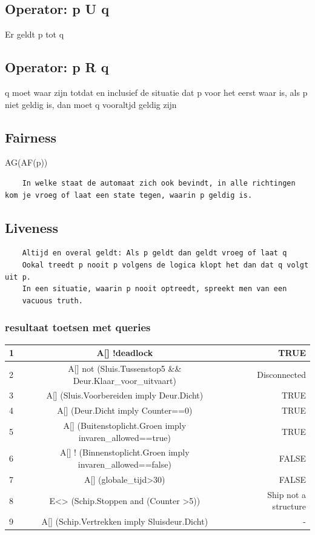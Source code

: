 \subsection{Operator: p U q}
Er geldt p tot q
~\cite{gnsguides}
\subsection{Operator: p R q}
q moet waar zijn totdat en inclusief de situatie dat p voor het eerst waar is, als p niet geldig is, dan moet q vooraltjd geldig zijn
\subsection{Fairness}
AG(AF(p))
\begin{verbatim}
	In welke staat de automaat zich ook bevindt, in alle richtingen kom je vroeg of laat een state tegen, waarin p geldig is.
\end{verbatim}
\subsection{Liveness}
\begin{verbatim}
	Altijd en overal geldt: Als p geldt dan geldt vroeg of laat q
	Ookal treedt p nooit p volgens de logica klopt het dan dat q volgt uit p.
	In een situatie, waarin p nooit optreedt, spreekt men van een
	vacuous truth.
\end{verbatim}

\subsubsection{resultaat toetsen met queries}
\begin{center}
	\begin{tabular}{| l | c || r | }
		\hline
		1 &A[] !deadlock  &  TRUE \\ \hline
		2 & A[] not (Sluis.Tussenstop5 \&\& Deur.Klaar\_voor\_uitvaart)  &  Disconnected \\ \hline
		3 & A[]  (Sluis.Voorbereiden imply Deur.Dicht)   &  TRUE\\   \hline
		4 &A[]  (Deur.Dicht imply Counter==0)   & TRUE  \\   \hline
		5 & A[]  (Buitenstoplicht.Groen imply invaren\_allowed==true)  &  TRUE \\ \hline
		6 & A[] ! (Binnenstoplicht.Groen imply invaren\_allowed==false)  & FALSE \\ \hline
		7 & A[]  (globale\_tijd>30)   &  FALSE\\    \hline
		8 & E<>  (Schip.Stoppen and (Counter >5))   & Ship not a structure  \\   \hline
		9 & A[] (Schip.Vertrekken imply Sluisdeur.Dicht)  &  -  \\   \hline
		\hline
	\end{tabular}
\end{center}

